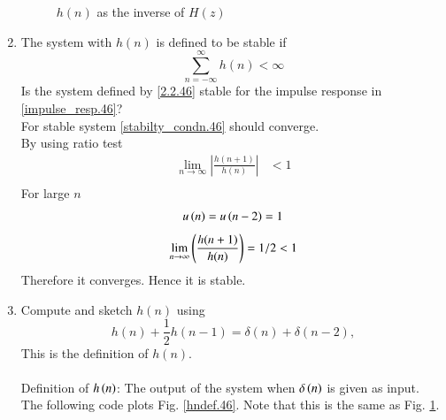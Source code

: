 \documentclass[journal,12pt,twocolumn]{IEEEtran}
\theoremstyle{remark}
\begin{document}
\begin{enumerate}
\begin{figure}[H]
\caption{$h(n)$ as the inverse of $H(z)$}
\label{hn.46}
\end{figure}
%
\item The system with $h(n)$ is defined to be stable if
\begin{equation}
\sum_{n=-\infty}^{\infty}h(n) < \infty \label{stabilty_condn.46}
\end{equation}
Is the system defined by \eqref{2.2.46} stable for the impulse response in \eqref{impulse_resp.46}?\\
\solution For stable system \eqref{stabilty_condn.46} should converge.\\
By using ratio test
\begin{align}
    \lim_{n \to \infty}\left|\frac{h(n + 1)}{h(n)}\right|&<1 \\
\end{align}
For large $n$ 
\begin{align}
    u\left(n\right)=u\left(n-2\right)=1
\end{align}
\begin{align}
  \lim_{n \to \infty}  \left(\frac{h(n + 1)}{h(n)}\right) = 1/2 <1
\end{align}
Therefore it converges. Hence it is stable.
\item 
Compute and sketch $h(n)$ using 
\begin{equation}
\label{iir_filter_h.46}
h(n) + \frac{1}{2}h(n-1) = \delta(n) + \delta(n-2), 
\end{equation}
%
This is the definition of $h(n)$.
\\
\solution\\
Definition of $h\left(n\right)$: The output of the system when $\delta\left(n\right)$ is given as input.\\

The following code plots Fig. \ref{hndef.46}. Note that this is the same as Fig. 
\ref{hn.46}. 


\end{enumerate}
\end{document}

